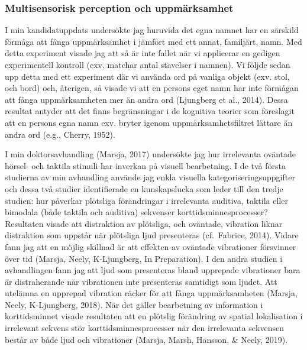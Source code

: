 \documentclass[]{article}
\begin{document}
\hypertarget{multisensorisk-perception-och-uppmuxe4rksamhet}{%
\subsubsection{Multisensorisk perception och
uppmärksamhet}\label{multisensorisk-perception-och-uppmuxe4rksamhet}}

I min kandidatuppdats undersökte jag huruvida det egna namnet har en
särskild förmåga att fånga uppmärksamhet i jämfört med ett annat,
familjärt, namn. Med detta experiment visade jag att så är inte fallet
när vi applicerar en gedigen experimentell kontroll (exv. matchar antal
stavelser i namnen). Vi följde sedan upp detta med ett experiment där vi
använda ord på vanliga objekt (exv. stol, och bord) och, återigen, så
visade vi att en persons eget namn har inte förmågan att fånga
uppmärksamheten mer än andra ord (Ljungberg et al., 2014). Dessa
resultat antyder att det finns begränsningar i de kognitiva teorier som
föreslagit att en persons egna namn exv. bryter igenom
uppmärksamhetsfiltret lättare än andra ord (e.g., Cherry, 1952).

I min doktorsavhandling (Marsja, 2017) undersökte jag hur irrelevanta
oväntade hörsel- och taktila stimuli har inverkan på visuell
bearbetning. I de två första studierna av min avhandling använde jag
enkla visuella kategoriseringsuppgifter och dessa två studier
identifierade en kunskapslucka som leder till den tredje studien: hur
påverkar plötsliga förändringar i irrelevanta auditiva, taktila eller
bimodala (både taktila och auditiva) sekvenser korttidsminnesprocesser?
Resultaten visade att distraktion av plötsliga, och oväntade, vibration
liknar distraktion som uppstår när plötsliga ljud presenteras
(cf.~Fabrice, 2014). Vidare fann jag att en möjlig skillnad är att
effekten av oväntade vibrationer försvinner över tid (Marsja, Neely,
K-Ljungberg, In Preparation). I den andra studien i avhandlingen fann
jag att ljud som presenteras bland upprepade vibrationer bara är
distraherande när vibrationen inte presenteras samtidigt som ljudet. Att
utelämna en upprepad vibration räcker för att fånga uppmärksamheten
(Marsja, Neely, K-Ljungberg, 2018). När det gäller bearbetning av
information i korttidsminnet visade resultaten att en plötslig
förändring av spatial lokalisation i irrelevant sekvens stör
korttidsminnesprocesser när den irrelevanta sekvensen består av både
ljud och vibrationer (Marsja, Marsh, Hansson, \& Neely, 2019).
\end{document}
